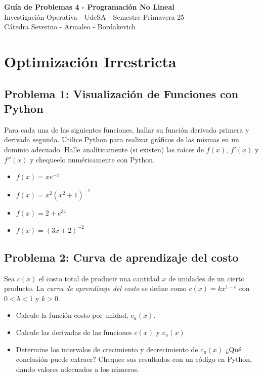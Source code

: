 \documentclass[12pt]{article}
\begin{document}
\begin{center}
    {\Large \textbf{Guía de Problemas 4 - Programación No Lineal}}\\[0.75em]
    {Investigación Operativa - UdeSA - Semestre Primavera 25 \\ Cátedra Severino - Armaleo - Bordakevich}
\end{center}
\section{Optimización Irrestricta}

\subsection*{Problema 1: Visualización de Funciones con Python}

Para cada una de las siguientes funciones, hallar su función derivada primera y derivada segunda. Utilice Python para realizar gráficos de las mismas en un dominio adecuado. Halle analíticamente (si existen) las raíces de $f(x)$, $f'(x)$ y $f''(x)$ y chequeelo numéricamente con Python.
\begin{itemize}
    \item[a)] $f(x) = xe^{-x}$
    \item[b)] $f(x) = x^2 (x^2+1)^{-1}$
    \item[c)] $f(x) = 2 + e^{3x}$
    \item[d)] $f(x) = (3x+2)^{-2}$
\end{itemize}

\subsection*{Problema 2: Curva de aprendizaje del costo}

Sea $c(x)$ el costo total de producir una cantidad $x$ de unidades de un cierto producto. La \textit{curva de aprendizaje del costo} se define como $c(x) = kx^{1-b}$ con $0 < b < 1$ y $k>0$.
\begin{itemize}
    \item[a)] Calcule la función costo por unidad, $c_u (x)$. 
    \item[b)] Calcule las derivadas de las funciones $c(x)$ y $c_u (x)$
    \item[c)] Determine los intervalos de crecimiento y decrecimiento de $c_u (x)$ ¿Qué conclusión puede extraer? Chequee sus resultados con un código en Python, dando valores adecuados a los números.
\end{itemize}
\end{document}
